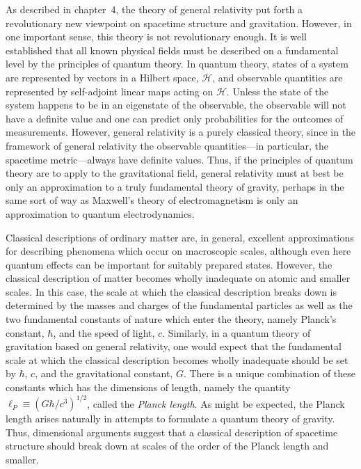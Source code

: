 
\setcounter{footnote}{0}

As described in chapter~4, the theory of general relativity put forth a revolutionary
new viewpoint on spacetime structure and gravitation. However, in one important
sense, this theory is not revolutionary enough. It is well established that all known
physical fields must be described on a fundamental level by the principles of quantum
theory. In quantum theory, states of a system are represented by vectors in a Hilbert
space, \(\mathcal H\), and observable quantities are represented by self-adjoint linear maps
acting on \(\mathcal H\). Unless the state of the system happens to be in an eigenstate of the
observable, the observable will not have a definite value and one can predict only
probabilities for the outcomes of measurements. However, general relativity is a
purely classical theory, since in the framework of general relativity the observable
quantities---in particular, the spacetime metric---always have definite values. Thus,
if the principles of quantum theory are to apply to the gravitational field, general
relativity must at best be only an approximation to a truly fundamental theory of
gravity, perhaps in the same sort of way as Maxwell's theory of electromagnetism
is only an approximation to quantum electrodynamics.

Classical descriptions of ordinary matter are, in general, excellent approximations
for describing phenomena which occur on macroscopic scales, although even here
quantum effects can be important for suitably prepared states. However, the classical
description of matter becomes wholly inadequate on atomic and smaller scales. In
this case, the scale at which the classical description breaks down is determined by
the masses and charges of the fundamental particles as well as the two fundamental
constants of nature which enter the theory, namely Planck's constant, \(\hbar\), and the
speed of light, \(c\). Similarly, in a quantum theory of gravitation based on general
relativity, one would expect that the fundamental scale at which the classical description
becomes wholly inadequate should be set by \(\hbar\), \(c\), and the gravitational constant,
\(G\). There is a unique combination of these constants which has the dimensions of
length, namely the quantity
\(\ell_P\equiv(G\hbar/c^3)^{1/2}\), called the \emph{Planck length}. As might be
expected, the Planck length arises naturally in attempts to formulate a quantum
theory of gravity. Thus, dimensional arguments suggest that a classical description
of spacetime structure should break down at scales of the order of the Planck length
and smaller.

